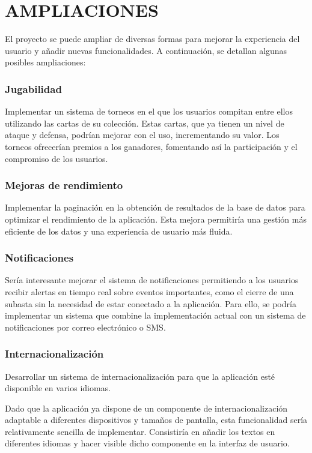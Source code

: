 \newpage
\section{AMPLIACIONES}

El proyecto se puede ampliar de diversas formas para mejorar la experiencia del usuario y añadir nuevas funcionalidades. A continuación, se detallan algunas posibles ampliaciones:

    \subsubsection{Jugabilidad}
    Implementar un sistema de torneos en el que los usuarios compitan entre ellos utilizando las cartas de su colección. 
    Estas cartas, que ya tienen un nivel de ataque y defensa, podrían mejorar con el uso, incrementando su valor. Los torneos ofrecerían premios a los ganadores, 
    fomentando así la participación y el compromiso de los usuarios.


    \subsubsection{Mejoras de rendimiento}
    Implementar la paginación en la obtención de resultados de la base de datos para optimizar el rendimiento de la aplicación. 
    Esta mejora permitiría una gestión más eficiente de los datos y una experiencia de usuario más fluida.


    \subsubsection{Notificaciones}
    Sería interesante mejorar el sistema de notificaciones permitiendo a los usuarios recibir 
    alertas en tiempo real sobre eventos importantes, como el cierre de una subasta sin la necesidad de estar conectado a la aplicación.
    Para ello, se podría implementar un sistema que combine la implementación actual con un sistema de notificaciones por correo electrónico o SMS.

    \subsubsection{Internacionalización}
    Desarrollar un sistema de internacionalización para que la aplicación esté disponible en varios idiomas. 

    Dado que la aplicación ya dispone de un componente de internacionalización adaptable a diferentes dispositivos y tamaños de pantalla, esta funcionalidad sería relativamente sencilla de implementar.
    Consistiría en añadir los textos en diferentes idiomas y hacer visible dicho componente en la interfaz de usuario.


